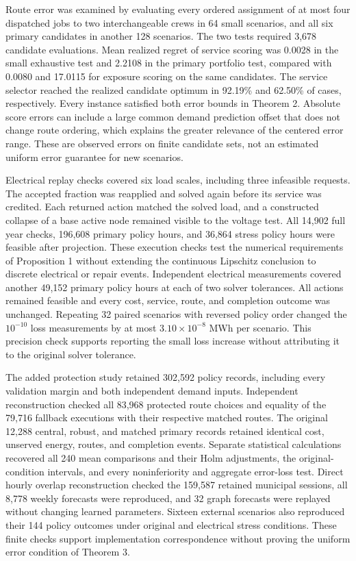 \documentclass[journal]{IEEEtran}
\begin{document}
Route error was examined by evaluating every ordered assignment of at most
four dispatched jobs to two interchangeable crews in 64 small scenarios, and
all six primary candidates in another 128 scenarios.  The two tests required
3,678 candidate evaluations.  Mean realized regret of service scoring was
0.0028 in the small exhaustive test and 2.2108 in the primary portfolio test,
compared with 0.0080 and 17.0115 for exposure scoring on the same candidates.
The service selector reached the realized candidate optimum in 92.19\% and
62.50\% of cases, respectively.  Every instance satisfied both error bounds in
Theorem 2.  Absolute score errors can include a large common demand prediction
offset that does not change route ordering, which explains the greater
relevance of the centered error range.  These are observed errors on finite
candidate sets, not an estimated uniform error guarantee for new scenarios.

Electrical replay checks covered six load scales, including three infeasible
requests.  The accepted fraction was reapplied and solved again before its
service was credited.  Each returned action matched the solved load, and a
constructed collapse of a base active node remained visible to the voltage
test.  All 14,902 full year checks, 196,608 primary policy hours, and 36,864
stress policy hours were feasible after projection.  These execution checks
test the numerical requirements of Proposition 1 without extending the
continuous Lipschitz conclusion to discrete electrical or repair events.
Independent electrical measurements covered another 49,152 primary policy
hours at each of two solver tolerances.  All actions remained feasible and
every cost, service, route, and completion outcome was unchanged.
Repeating 32 paired scenarios with reversed policy order changed the
$10^{-10}$ loss measurements by at most $3.10\times10^{-8}$ MWh per scenario.
This precision check supports reporting the small loss increase without
attributing it to the original solver tolerance.

The added protection study retained 302,592 policy records, including every
validation margin and both independent demand inputs.  Independent
reconstruction checked all 83,968 protected route choices and equality of
the 79,716 fallback executions with their respective matched routes.
The original 12,288 central, robust, and matched primary records retained
identical cost, unserved energy, routes, and completion events.
Separate statistical calculations recovered all 240 mean comparisons and
their Holm adjustments, the original-condition intervals, and every
noninferiority and aggregate error-loss test.  Direct hourly overlap
reconstruction checked the 159,587 retained municipal sessions, all 8,778
weekly forecasts were reproduced, and 32 graph forecasts were replayed
without changing learned parameters.  Sixteen external scenarios also
reproduced their 144 policy outcomes under original and electrical stress
conditions.  These finite checks support implementation correspondence
without proving the uniform error condition of Theorem 3.
\end{document}
